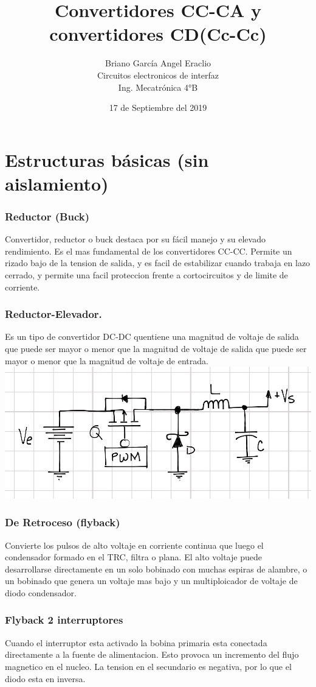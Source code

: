 \documentclass[11pt]{article}
\title{\textbf{Convertidores CC-CA y convertidores CD(Cc-Cc)}}
\author{Briano García Angel Eraclio\\
		Circuitos electronicos de interfaz\\
		Ing. Mecatrónica 4°B}
\date{17 de Septiembre del 2019}
\begin{document}
\maketitle
\newpage

\section{Estructuras básicas (sin aislamiento)}
\subsubsection{Reductor (Buck)}

Convertidor, reductor o buck destaca por su fácil manejo y su elevado rendimiento. Es el mas
fundamental de los convertidores CC-CC. Permite un rizado bajo de la tension de salida, y
es facil de estabilizar cuando trabaja en lazo cerrado, y permite una facil proteccion frente a
cortocircuitos y de limite de corriente.\subsubsection{Reductor-Elevador.}
Es un tipo de convertidor DC-DC quentiene una magnitud de voltaje de salida que puede
ser mayor o menor que la magnitud de voltaje de salida que puede ser mayor o menor que la
magnitud de voltaje de entrada.
\includegraphics[scale=1]{imagenes/img_0365.png} 
\subsubsection{De Retroceso (flyback)}
Convierte los pulsos de alto voltaje en corriente continua que
luego el condensador formado en el TRC, filtra o plana. El alto voltaje puede desarrollarse
directamente en un solo bobinado con muchas espiras de alambre, o un bobinado que genera
un voltaje mas bajo y un multiploicador de voltaje de diodo condensador.
\subsubsection{Flyback 2 interruptores}
Cuando el interruptor esta activado la bobina primaria esta conectada directamente a la
fuente de alimentacion. Esto provoca un incremento del flujo magnetico en el nucleo. La tension
en el secundario es negativa, por lo que el diodo esta en inversa.
\end{document}
